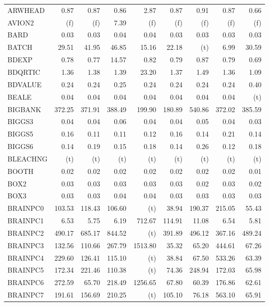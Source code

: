 \documentclass[11pt,twoside]{article}
\begin{document}
{\begin{longtable}[c]{|l|r|r|r|r|r|r|r|r|}
ARWHEAD & 0.87 & 0.87 & 0.86 & 2.87 & 0.87 & 0.91 & 0.87 & 0.66 \\
AVION2 & (f) & (f) & 7.39 & (f) & (f) & (f) & (f) & (f) \\
BARD & 0.03 & 0.03 & 0.04 & 0.04 & 0.03 & 0.03 & 0.03 & 0.03 \\
BATCH & 29.51 & 41.95 & 46.85 & 15.16 & 22.18 & (t) & 6.99 & 30.59 \\
BDEXP & 0.78 & 0.77 & 14.57 & 0.82 & 0.79 & 0.87 & 0.79 & 0.69 \\
BDQRTIC & 1.36 & 1.38 & 1.39 & 23.20 & 1.37 & 1.49 & 1.36 & 1.09 \\
BDVALUE & 0.24 & 0.24 & 0.25 & 0.24 & 0.24 & 0.24 & 0.24 & 0.40 \\
BEALE & 0.04 & 0.04 & 0.04 & 0.04 & 0.04 & 0.04 & 0.04 & (t) \\
BIGBANK & 372.25 & 371.91 & 388.49 & 199.90 & 180.89 & 540.86 & 372.02 & 385.59 \\
BIGGS3 & 0.04 & 0.04 & 0.06 & 0.04 & 0.04 & 0.05 & 0.04 & 0.03 \\
BIGGS5 & 0.16 & 0.11 & 0.11 & 0.12 & 0.16 & 0.14 & 0.21 & 0.14 \\
BIGGS6 & 0.14 & 0.19 & 0.15 & 0.18 & 0.14 & 0.26 & 0.12 & 0.18 \\
BLEACHNG & (t) & (t) & (t) & (t) & (t) & (t) & (t) & (t) \\
BOOTH & 0.02 & 0.02 & 0.02 & 0.02 & 0.02 & 0.02 & 0.02 & 0.01 \\
BOX2 & 0.03 & 0.03 & 0.03 & 0.03 & 0.03 & 0.02 & 0.03 & 0.02 \\
BOX3 & 0.03 & 0.03 & 0.04 & 0.04 & 0.03 & 0.03 & 0.03 & 0.03 \\
BRAINPC0 & 103.53 & 118.43 & 106.60 & (t) & 38.94 & 190.37 & 215.05 & 55.43 \\
BRAINPC1 & 6.53 & 5.75 & 6.19 & 712.67 & 114.91 & 11.08 & 6.54 & 5.81 \\
BRAINPC2 & 490.17 & 685.17 & 844.52 & (t) & 391.89 & 496.12 & 367.16 & 489.24 \\
BRAINPC3 & 132.56 & 110.66 & 267.79 & 1513.80 & 35.32 & 65.20 & 444.61 & 67.26 \\
BRAINPC4 & 229.60 & 126.41 & 115.10 & (t) & 38.84 & 67.50 & 533.26 & 63.39 \\
BRAINPC5 & 172.34 & 221.46 & 110.38 & (t) & 74.36 & 248.94 & 172.03 & 65.98 \\
BRAINPC6 & 272.59 & 65.70 & 218.49 & 1256.65 & 67.80 & 60.39 & 176.86 & 62.61 \\
BRAINPC7 & 191.61 & 156.69 & 210.25 & (t) & 105.10 & 76.18 & 563.10 & 65.91 \\

\end{longtable}}
\end{document}

